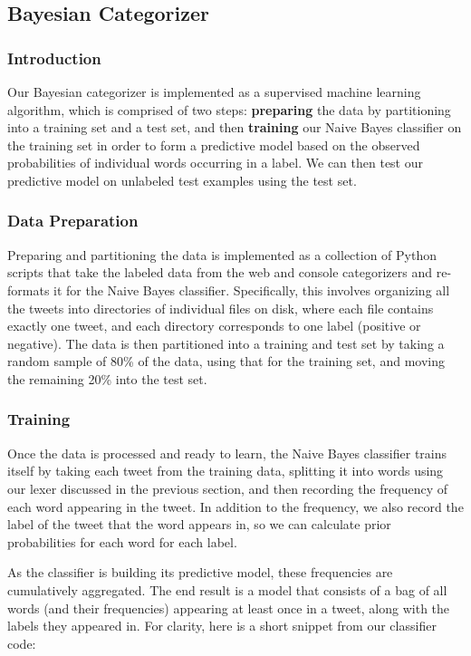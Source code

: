 \documentclass[12pt,a4paper]{article}
\begin{document}
\subsection { Bayesian Categorizer }

\subsubsection { Introduction }

Our Bayesian categorizer is implemented as a supervised machine learning algorithm, which is comprised of two steps: \textbf{preparing} the data by partitioning into a training set and a test set, and then \textbf{training} our Naive Bayes classifier on the training set in order to form a predictive model based on the observed probabilities of individual words occurring in a label. We can then test our predictive model on unlabeled test examples using the test set.

\subsubsection { Data Preparation }

Preparing and partitioning the data is implemented as a collection of Python scripts that take the labeled data from the web and console categorizers and re-formats it for the Naive Bayes classifier. Specifically, this involves organizing all the tweets into directories of individual files on disk, where each file contains exactly one tweet, and each directory corresponds to one label (positive or negative). The data is then partitioned into a training and test set by taking a random sample of 80\% of the data, using that for the training set, and moving the remaining 20\% into the test set.

\subsubsection { Training }

Once the data is processed and ready to learn, the Naive Bayes classifier trains itself by taking each tweet from the training data, splitting it into words using our lexer discussed in the previous section, and then recording the frequency of each word appearing in the tweet. In addition to the frequency, we also record the label of the tweet that the word appears in, so we can calculate prior probabilities for each word for each label.

As the classifier is building its predictive model, these frequencies are cumulatively aggregated. The end result is a model that consists of a bag of all words (and their frequencies) appearing at least once in a tweet, along with the labels they appeared in. For clarity, here is a short snippet from our classifier code:
\end{document}

